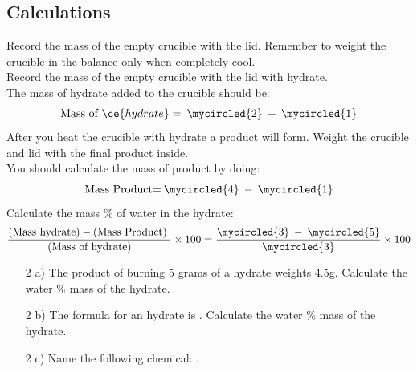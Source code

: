 \documentclass[main.tex]{subfiles}
\begin{document}
\newpage
\begin{fullwidth}
\subsection*{Calculations}
 Record the mass of the empty crucible with the lid. Remember to weight the crucible in the balance only when completely cool.\vspace{0.5cm}\\
 Record the mass of the empty crucible with the lid with hydrate.\vspace{0.5cm}\\
 The mass of hydrate added to the crucible should be:
\[\text{Mass of }\ce{hydrate}= \: \mycircled{2}\: - \: \mycircled{1}\] \vspace{0.5cm}
 After you heat the crucible with hydrate a product will form. Weight the crucible and lid with the final product inside.\\ \vspace{0.5cm}
 You should calculate the mass of product by doing:
\[\text{Mass Product=} \: \mycircled{4}\:-\: \mycircled{1}\] \vspace{0.5cm}
 Calculate the mass \% of water in the hydrate:
\[\frac{\text{(Mass  hydrate)} - \text{(Mass Product) }}{\text{(Mass of hydrate)}}\times 100 = \frac{\mycircled{3} \: - \: \mycircled{5} }{\mycircled{3} }\times 100 \] \vspace{0.5cm}


\vspace{0.6cm}{\large \bfseries PostLab questions }
\begin{enumerate}
\item[2 a)] The product of burning 5 grams of a hydrate weights 4.5g. Calculate the water \% mass of the hydrate.
\vspace{3.7cm}
\item[2 b)] The formula for an hydrate is  . Calculate the water \% mass of the hydrate.
\vspace{3.7cm}
\item[2 c)] Name the following chemical:  .
\vspace{3.7cm}
\end{enumerate}


\end{fullwidth}
\end{document}
